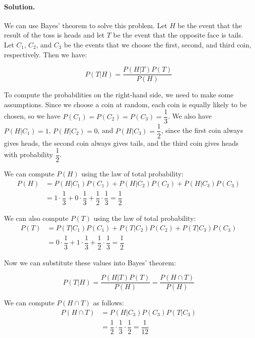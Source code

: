\paragraph{Solution.} We can use Bayes' theorem to solve this problem. Let $H$ be the event that the result of the toss is heads and let $T$ be the event that the opposite face is tails. Let $C_1$, $C_2$, and $C_3$ be the events that we choose the first, second, and third coin, respectively. Then we have:

$$P(T|H) = \dfrac{P(H|T)P(T)}{P(H)}$$

To compute the probabilities on the right-hand side, we need to make some assumptions.
Since we choose a coin at random, each coin is equally likely to be chosen,
so we have $P(C_1) = P(C_2) = P(C_3) = \dfrac{1}{3}$.
We also have $P(H|C_1) = 1$, $P(H|C_2) = 0$, and $P(H|C_3) = \dfrac{1}{2}$,
since the first coin always gives heads, the second coin always gives tails, and the third coin gives heads with probability $\dfrac{1}{2}$.

We can compute $P(H)$ using the law of total probability:
\begin{align*}
    P(H) & = P(H|C_1)P(C_1) + P(H|C_2)P(C_2) + P(H|C_3)P(C_3)                                             \\
         & = 1 \cdot \dfrac{1}{3} + 0 \cdot \dfrac{1}{3} + \dfrac{1}{2} \cdot \dfrac{1}{3} = \dfrac{1}{2}
\end{align*}


We can also compute $P(T)$ using the law of total probability:
\begin{align*}
    P(T) & = P(T|C_1)P(C_1) + P(T|C_2)P(C_2) + P(T|C_3)P(C_3)                                             \\
         & = 0 \cdot \dfrac{1}{3} + 1 \cdot \dfrac{1}{3} + \dfrac{1}{2} \cdot \dfrac{1}{3} = \dfrac{1}{2}
\end{align*}

Now we can substitute these values into Bayes' theorem:

$$P(T|H) = \dfrac{P(H|T)P(T)}{P(H)} = \dfrac{P(H \cap T)}{P(H)}$$

We can compute $P(H \cap T)$ as follows:
\begin{align*}
    P(H \cap T) & = P(H|C_3)P(C_3)P(T|C_3)                                             \\
                & = \dfrac{1}{2} \cdot \dfrac{1}{3} \cdot \dfrac{1}{2} = \dfrac{1}{12}
\end{align*}

